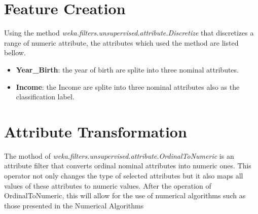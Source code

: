 \section{Feature Creation}
Using the method \textit{weka.filters.unsupervised.attribute.Discretize} that discretizes a range of numeric attribute, the attributes which used the method are listed bellow.
\begin{itemize}
    \item \textbf{Year\_Birth}: the year of birth are splite into three nominal attributes.
    \item \textbf{Income}: the Income are splite into three nominal attributes also as the classification label.
\end{itemize}


\section{Attribute Transformation}
The mothod of \textit{weka.filters.unsupervised.attribute.OrdinalToNumeric} is an attribute filter that converts ordinal nominal attributes into numeric ones. This operator not only changes the type of selected attributes but it also maps all values of these attributes to numeric values. 
After the operation of OrdinalToNumeric, this will allow for the use of numerical algorithms such as those presented in the Numerical Algorithms

